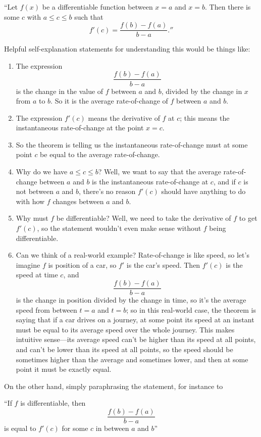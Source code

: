 \documentclass{article}
\begin{document}
``Let $f(x)$ be a differentiable function between $x=a$ and $x=b$. Then there is some $c$ with $a\leq c\leq b$ such that
\[f'(c)=\frac{f(b)-f(a)}{b-a}.''\]

Helpful self-explanation statements for understanding this would be things like:
\begin{enumerate}
	\item The expression
		\[\frac{f(b)-f(a)}{b-a}\]
		is the change in the value of $f$ between $a$ and $b$, divided by the change in $x$ from $a$ to $b$. So it is the average rate-of-change of $f$ between $a$ and $b$.
	\item The expression $f'(c)$ means the derivative of $f$ at $c$; this means the instantaneous rate-of-change at the point $x=c$.
	\item So the theorem is telling us the instantaneous rate-of-change must at some point $c$ be equal to the average rate-of-change.
	\item Why do we have $a\leq c\leq b$? Well, we want to say that the average rate-of-change between $a$ and $b$ is the instantaneous rate-of-change at $c$, and if $c$ is not between $a$ and $b$, there's no reason $f'(c)$ should have anything to do with how $f$ changes between $a$ and $b$.
	\item Why must $f$ be differentiable? Well, we need to take the derivative of $f$ to get $f'(c)$, so the statement wouldn't even make sense without $f$ being differentiable.
	\item Can we think of a real-world example? Rate-of-change is like speed, so let's imagine $f$ is position of a car, so $f'$ is the car's speed. Then $f'(c)$ is the speed at time $c$, and
		\[\frac{f(b)-f(a)}{b-a}\]
		is the change in position divided by the change in time, so it's the average speed from between $t=a$ and $t=b$; so in this real-world case, the theorem is saying that if a car drives on a journey, at some point its speed at an instant must be equal to its average speed over the whole journey. This makes intuitive sense---its average speed can't be higher than its speed at all points, and can't be lower than its speed at all points, so the speed should be sometimes higher than the average and sometimes lower, and then at some point it must be exactly equal.
\end{enumerate}\bigskip


On the other hand, simply paraphrasing the statement, for instance to\smallskip

``If $f$ is differentiable, then
\[\frac{f(b)-f(a)}{b-a}\]
is equal to $f'(c)$ for some $c$ in between $a$ and $b$''\smallskip
\end{document}
